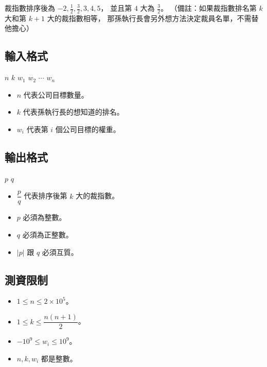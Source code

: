 裁指數排序後為 \(-2, \frac{1}{2}, \frac{3}{2}, 3, 4, 5\)， 並且第 \(4\)
大為 \(\frac{3}{2}\)。 （備註：如果裁指數排名第 \(k\) 大和第 \(k+1\)
大的裁指數相等， 那孫執行長會另外想方法決定裁員名單，不需替他擔心）

\subsection{輸入格式}

\begin{format}
\f{
$n$ $k$
$w_1$ $w_2$ $\cdots$ $w_n$
}
\end{format}

\begin{itemize}
\tightlist
\item
  \(n\) 代表公司目標數量。
\item
  \(k\) 代表孫執行長的想知道的排名。
\item
  \(w_i\) 代表第 \(i\) 個公司目標的權重。
\end{itemize}

\subsection{輸出格式}

\begin{format}
\f{
$p$
$q$
}
\end{format}

\begin{itemize}
\tightlist
\item
  \(\dfrac{p}{q}\) 代表排序後第 \(k\) 大的裁指數。
\item
  \(p\) 必須為整數。
\item
  \(q\) 必須為正整數。
\item
  \(|p|\) 跟 \(q\) 必須互質。
\end{itemize}

\subsection{測資限制}

\begin{itemize}
\tightlist
\item
  \(1 \le n \le 2\times 10^5\)。
\item
  \(1 \le k \le \dfrac{n(n+1)}{2}\)。
\item
  \(-{10}^9 \le w_i \le {10}^9\)。
\item
  \(n, k, w_i\) 都是整數。
\end{itemize}

